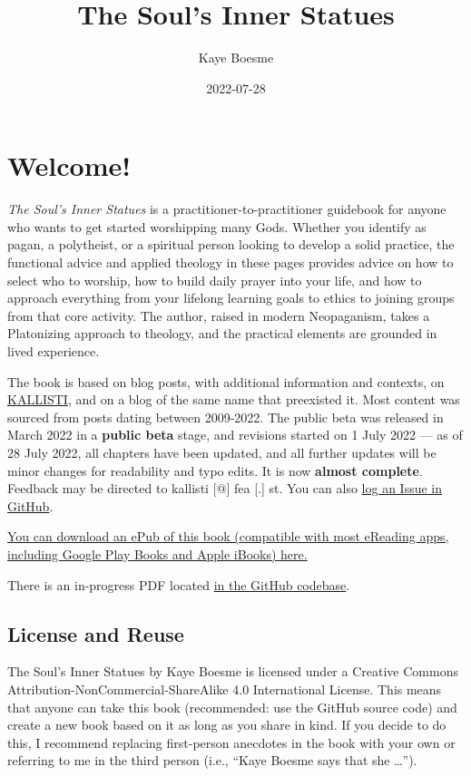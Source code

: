 \documentclass[
]{book}
\title{The Soul's Inner Statues}
\author{Kaye Boesme}
\date{2022-07-28}
\begin{document}
\maketitle

{
\setcounter{tocdepth}{1}
\tableofcontents
}
\hypertarget{welcome}{%
\chapter{Welcome!}\label{welcome}}

\emph{The Soul's Inner Statues} is a practitioner-to-practitioner guidebook for anyone who wants to get started worshipping many Gods. Whether you identify as pagan, a polytheist, or a spiritual person looking to develop a solid practice, the functional advice and applied theology in these pages provides advice on how to select who to worship, how to build daily prayer into your life, and how to approach everything from your lifelong learning goals to ethics to joining groups from that core activity. The author, raised in modern Neopaganism, takes a Platonizing approach to theology, and the practical elements are grounded in lived experience.

The book is based on blog posts, with additional information and contexts, on \href{https://kallisti.blog}{KALLISTI}, and on a blog of the same name that preexisted it. Most content was sourced from posts dating between 2009-2022. The public beta was released in March 2022 in a \textbf{public beta} stage, and revisions started on 1 July 2022 --- as of 28 July 2022, all chapters have been updated, and all further updates will be minor changes for readability and typo edits. It is now \textbf{almost complete}. Feedback may be directed to kallisti {[}@{]} fea {[}.{]} st. You can also \href{https://github.com/kayeofswords/soulsinnerstatues/}{log an Issue in GitHub}.

\href{souls-inner-statues.epub}{You can download an ePub of this book (compatible with most eReading apps, including Google Play Books and Apple iBooks) here.}

There is an in-progress PDF located \href{https://github.com/kayeofswords/soulsinnerstatues/tree/master/docs}{in the GitHub codebase}.

\hypertarget{license-and-reuse}{%
\section{License and Reuse}\label{license-and-reuse}}

{The Soul's Inner Statues} by Kaye Boesme is licensed under a Creative Commons Attribution-NonCommercial-ShareAlike 4.0 International License. This means that anyone can take this book (recommended: use the GitHub source code) and create a new book based on it as long as you share in kind. If you decide to do this, I recommend replacing first-person anecdotes in the book with your own or referring to me in the third person (i.e., ``Kaye Boesme says that she \ldots{}'').
\end{document}
